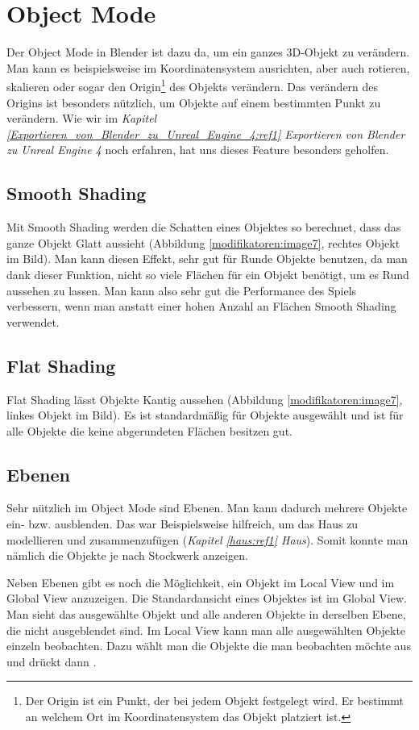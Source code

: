 \section{Object Mode}
Der Object Mode in Blender ist dazu da, um ein ganzes 3D-Objekt zu verändern. Man kann es beispielsweise im Koordinatensystem ausrichten, aber
auch rotieren, skalieren oder sogar den Origin\footnote{Der Origin ist ein Punkt, der bei jedem Objekt festgelegt wird. Er bestimmt an welchem Ort im Koordinatensystem das Objekt platziert ist.}
des Objekts verändern. Das verändern des Origins ist besonders nützlich, um Objekte auf einem bestimmten Punkt zu verändern.
Wie wir im \textit{Kapitel \ref{Exportieren_von_Blender_zu_Unreal_Engine_4:ref1} \dq{} Exportieren von Blender zu Unreal Engine 4\dq} noch erfahren, hat uns dieses Feature besonders geholfen.

\subsection{Smooth Shading}
\label{objectMode:smoothshading}
Mit Smooth Shading werden die Schatten eines Objektes so berechnet, dass das ganze Objekt Glatt aussieht (Abbildung \ref{modifikatoren:image7}, rechtes Objekt im Bild).
Man kann diesen Effekt, sehr gut für Runde Objekte benutzen, da man dank dieser Funktion, nicht so viele Flächen für ein Objekt benötigt, um
es Rund aussehen zu lassen. Man kann also sehr gut die Performance des Spiels verbessern, wenn man anstatt einer hohen Anzahl an Flächen Smooth Shading verwendet.

\subsection{Flat Shading}
Flat Shading lässt Objekte Kantig aussehen (Abbildung \ref{modifikatoren:image7}, linkes Objekt im Bild).
Es ist standardmäßig für Objekte ausgewählt und ist für alle Objekte die keine abgerundeten Flächen besitzen gut.

\subsection{Ebenen}
Sehr nützlich im Object Mode sind Ebenen. Man kann dadurch mehrere Objekte ein- bzw. ausblenden.
Das war Beispielsweise hilfreich, um das Haus zu modellieren und zusammenzufügen (\textit{Kapitel \ref{haus:ref1} \dq Haus\dq}).
Somit konnte man nämlich die Objekte je nach Stockwerk anzeigen.

Neben Ebenen gibt es noch die Möglichkeit, ein Objekt im Local View und im Global View anzuzeigen.
Die Standardansicht eines Objektes ist im Global View. Man sieht das ausgewählte Objekt und alle anderen Objekte in derselben Ebene, die nicht ausgeblendet sind.
Im Local View kann man alle ausgewählten Objekte einzeln beobachten. Dazu wählt man die Objekte die man beobachten möchte aus und drückt dann .

